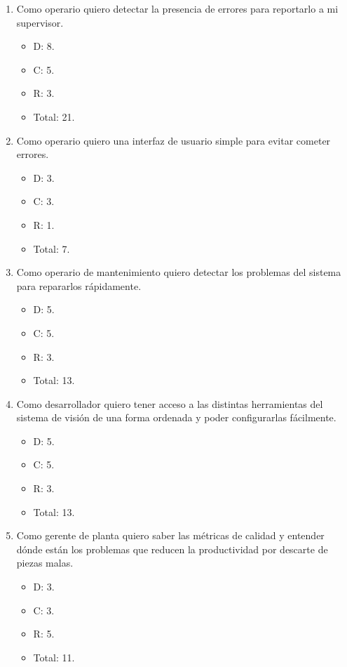 \documentclass[
11pt, %
codirector, %
]{charter}
\begin{document}
\begin{enumerate}

	\item Como operario quiero detectar la presencia de errores para reportarlo a mi supervisor.
	\begin{itemize}
		\item D: 8.
		\item C: 5.
		\item R: 3.
		\item Total: 21.
	\end{itemize}

	\item Como operario quiero una interfaz de usuario simple para evitar cometer errores.
	\begin{itemize}
		\item D: 3.
		\item C: 3.
		\item R: 1.
		\item Total: 7.
	\end{itemize}
	
	\item Como operario de mantenimiento quiero detectar los problemas del sistema para repararlos rápidamente.
	\begin{itemize}
		\item D: 5.
		\item C: 5.
		\item R: 3.
		\item Total: 13.
	\end{itemize}
	
	\item Como desarrollador quiero tener acceso a las distintas herramientas del sistema de visión de una forma ordenada y poder configurarlas fácilmente.
	\begin{itemize}
		\item D: 5.
		\item C: 5.
		\item R: 3.
		\item Total: 13.
	\end{itemize}	
	
	\item Como gerente de planta quiero saber las métricas de calidad y entender dónde están los problemas que reducen la productividad por descarte de piezas malas.
	\begin{itemize}
		\item D: 3.
		\item C: 3.
		\item R: 5.
		\item Total: 11.
	\end{itemize}	
	
\end{enumerate}
\end{document}
